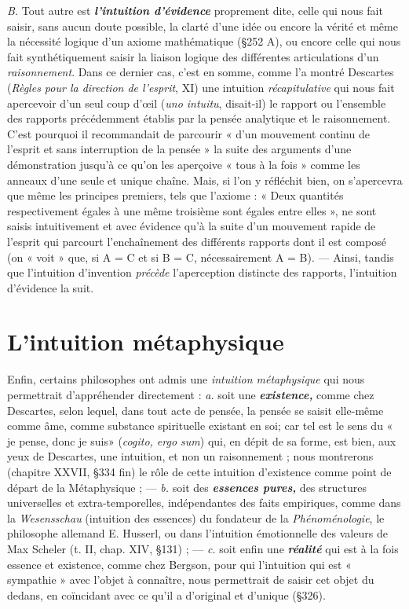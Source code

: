 {\it B.} Tout autre est \textbf{\textit {l'intuition d’évidence}} proprement dite, celle
qui nous fait saisir, sans aucun doute possible, la clarté d’une idée ou
encore la vérité et même la nécessité logique d’un axiome mathématique
(\S 252 A), ou encore celle qui nous fait synthétiquement saisir la
liaison logique des différentes articulations d’un {\it raisonnement}. Dans
ce dernier cas, c’est en somme, comme l’a montré Descartes ({\it Règles
pour la direction de l'esprit}, XI) une intuition {\it récapitulative} qui nous
fait apercevoir d’un seul coup d’œil ({\it uno intuitu}, disait-il) le rapport
ou l’ensemble des rapports précédemment établis par la pensée analytique
et le raisonnement. C’est pourquoi il recommandait de parcourir
« d’un mouvement continu de l'esprit et sans interruption de la
pensée » la suite des arguments d’une démonstration jusqu’à ce qu’on
les aperçoive « tous à la fois » comme les anneaux d’une seule et unique
chaîne. Mais, si l’on y réfléchit bien, on s’apercevra que même les
principes premiers, tels que l’axiome : « Deux quantités respectivement
égales à une même troisième sont égales entre elles », ne sont
saisis intuitivement et avec évidence qu’à la suite d’un mouvement
rapide de l’esprit qui parcourt l’enchaînement des différents rapports
dont il est composé (on « voit » que, si A = C et si B = C, nécessairement
A = B). — Ainsi, tandis que l’intuition d'invention {\it précède}
l’aperception distincte des rapports, l'intuition d’évidence la suit.

\section{L’intuition métaphysique}%
Enfin, certains philosophes
ont admis une {\it intuition métaphysique} qui nous permettrait d’appréhender
directement : {\it a.} soit une \textbf{\textit {existence,}} comme chez Descartes,
selon lequel, dans tout acte de pensée, la pensée se saisit elle-même
comme âme, comme substance spirituelle existant en soi; car tel est
le sens du « je pense, donc je suis» ({\it cogito, ergo sum}) qui, en dépit de
sa forme, est bien, aux yeux de Descartes, une intuition, et non un
raisonnement ; nous montrerons (chapitre XXVII, \S 334 fin) le rôle
de cette intuition d’existence comme point de départ de la Métaphysique ;
— {\it b.} soit des \textbf{\textit {essences pures,}} des structures universelles
et extra-temporelles, indépendantes des faits empiriques, comme
dans la {\it Wesensschau} (intuition des essences) du fondateur de la {\it Phénoménologie},
le philosophe allemand E. Husserl, ou dans l'intuition
émotionnelle des valeurs de Max Scheler (t. II, chap. XIV, \S 131) ;
— {\it c.} soit enfin une \textbf{\textit {réalité}} qui est à la fois essence et existence, comme
chez Bergson, pour qui l'intuition qui est « sympathie » avec l’objet
à connaître, nous permettrait de saisir cet objet du dedans, en coïncidant
avec ce qu’il a d’original et d’unique (\S 326).

